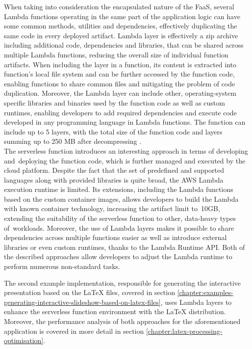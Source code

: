 When taking into consideration the encapsulated nature of the FaaS, several Lambda functions operating in the same part of the application logic can have some common methods, utilities and dependencies, effectively duplicating the same code in every deployed artifact.
Lambda layer is effectively a zip archive including additional code, dependencies and libraries, that can be shared across multiple Lambda functions, reducing the overall size of individual function artifacts.
When including the layer in a function, its content is extracted into function's local file system and can be further accessed by the function code, enabling functions to share common files and mitigating the problem of code duplication.
Moreover, the Lambda layer can include other, operating-system specific libraries and binaries used by the function code as well as custom runtimes, enabling developers to add required dependencies and execute code developed in any programming language in Lambda functions.
The function can include up to 5 layers, with the total size of the function code and layers summing up to 250 MB after decompressing \cite{AWSLambdaLayer}. \\

The serverless function introduces an interesting approach in terms of developing and~deploying the function code, which is further managed and executed by the cloud platform. Despite the fact that the set of predefined and supported languages along with provided libraries is quite broad, the AWS Lambda execution runtime is limited.
Its extensions, including the Lambda functions based on the custom container images, allows developers to build the Lambda with known container technology, increasing the artifact limit to~10GB, extending the suitability of the serverless function to other, data-heavy types of~workloads.
Moreover, the use of Lambda layers makes it possible to share dependencies across multiple functions easier as well as introduce external libraries or even custom runtimes, thanks to the Lambda Runtime API.
Both of the described approaches allow developers to adjust the Lambda runtime to perform numerous non-standard tasks.

The second example implementation, responsible for generating the interactive presentation based on the LaTeX files, covered in section \ref{chapter:examples-generating-interactive-slideshow-based-on-latex-files}, uses Lambda layers to enhance the serverless function environment with the LaTeX distribution.
Moreover, the performance analysis of both approaches for the aforementioned application is covered in more detail in section \ref{chapter:latex-processing-optimisation}.

